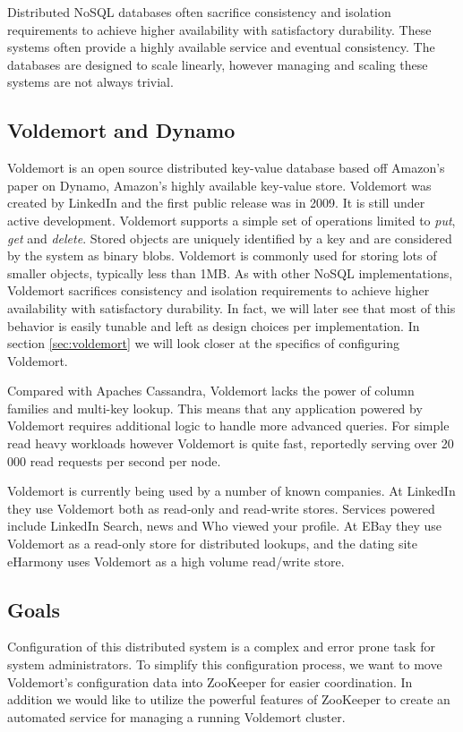 Distributed NoSQL databases often sacrifice consistency and isolation requirements to achieve higher availability with satisfactory durability. These systems often provide a highly available service and eventual consistency.
The databases are designed to scale linearly, however managing and scaling these systems are not always trivial\cite{tellybug}. 


\subsection{Voldemort and Dynamo}
Voldemort is an open source distributed key-value database based off Amazon's paper on Dynamo, Amazon's highly available key-value store. Voldemort was created by LinkedIn and the first public release was in 2009. It is still under active development. Voldemort supports a simple set of operations limited to \emph{put}, \emph{get} and \emph{delete}. Stored objects are uniquely identified by a key and are considered by the system as binary blobs. Voldemort is commonly used for storing lots of smaller objects, typically less than 1MB.  As with other NoSQL implementations, Voldemort sacrifices consistency and isolation requirements to achieve higher availability with satisfactory durability. In fact, we will later see that most of this behavior is easily tunable and left as design choices per implementation. In section \ref{sec:voldemort} we will look closer at the specifics of configuring Voldemort. 

Compared with Apaches Cassandra, Voldemort lacks the power of column families and multi-key lookup. This means that any application powered by Voldemort requires additional logic to handle more advanced queries. For simple read heavy workloads however Voldemort is quite fast, reportedly serving over 20 000 read requests per second per node\cite{voldemort}. 

Voldemort is currently being used by a number of known companies. At LinkedIn they use Voldemort both as read-only and read-write stores. Services powered include LinkedIn Search, news and Who viewed your profile. At EBay they use Voldemort as a read-only store for distributed lookups, and the dating site eHarmony uses Voldemort as a high volume read/write store.


\subsection{Goals}
Configuration of this distributed system is a complex and error prone task for system administrators.
To simplify this configuration process, we want to move Voldemort's configuration data into ZooKeeper for easier coordination. In addition we would like to utilize the powerful features of ZooKeeper to create an automated service for managing a running Voldemort cluster. 

